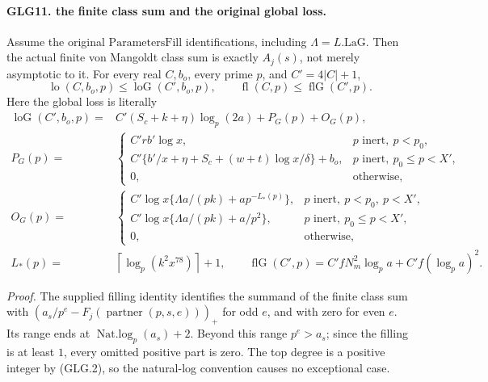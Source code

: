 \paragraph{GLG11. the finite class sum and the original global loss.}
\label{claim:GLG11}
Assume the original \(\mathrm{ParametersFill}\) identifications,
including \(\Lambda=L.\mathrm{LaG}\). Then the actual finite
von Mangoldt class sum is exactly \(A_j(s)\), not merely
asymptotic to it. For every real \(C,b_o\), every prime \(p\),
and \(C'=4|C|+1\),
\[
 \operatorname{lo}(C,b_o,p)\le\operatorname{loG}(C',b_o,p),
 \qquad
 \operatorname{fl}(C,p)\le\operatorname{flG}(C',p).                \tag{GLG.36}
\]
Here the global loss is literally
\[
 \begin{split}
 \operatorname{loG}(C',b_o,p)
 ={}&C'(S_c+k+\eta)\log_p(2a)+P_G(p)+O_G(p),\\
 P_G(p)={}&
 \begin{cases}
 C'rb'\log x,&p\text{ inert},\ p<p_0,\\
 C'\{b'/x+\eta+S_c+(w+t)\log x/\delta\}+b_o,
                          &p\text{ inert},\ p_0\le p<X',\\
 0,&\text{otherwise},
 \end{cases}\\
 O_G(p)={}&
 \begin{cases}
 C'\log x\{\Lambda a/(pk)+ap^{-L_*(p)}\},
                          &p\text{ inert},\ p<p_0,\ p<X',\\
 C'\log x\{\Lambda a/(pk)+a/p^2\},
                          &p\text{ inert},\ p_0\le p<X',\\
 0,&\text{otherwise},
 \end{cases}\\
 L_*(p)={}&\left\lceil\log_p(k^2x^{78})\right\rceil+1,\qquad
 \operatorname{flG}(C',p)=C'fN_m^2\log_pa+C'f(\log_pa)^2 .
 \end{split}                                                       \tag{GLG.37}
\]

\emph{Proof.}
The supplied filling identity identifies the summand of
the finite class sum with
\((a_s/p^e-F_j(\operatorname{partner}(p,s,e)))_+\) for
odd \(e\), and with zero for even \(e\). Its range ends
at \(\operatorname{Nat.log}_p(a_s)+2\). Beyond this range
\(p^e>a_s\); since the filling is at least \(1\), every
omitted positive part is zero. The top degree is a positive
integer by (GLG.2), so the natural-log convention causes
no exceptional case.

